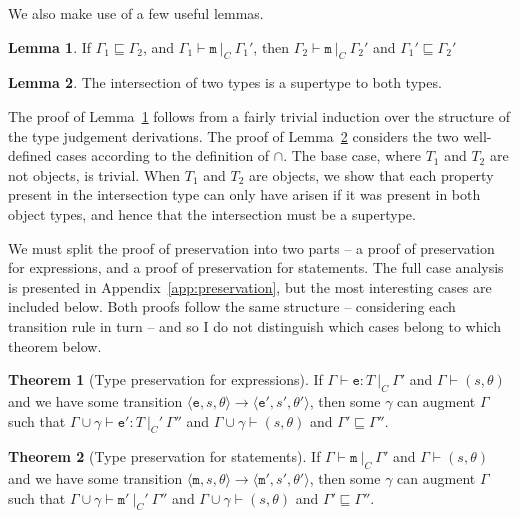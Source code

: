 \documentclass[12pt,a4paper,twoside,openright]{report}
\theoremstyle{definition}
\theoremstyle{dotless}
\newtheorem{lemma}{Lemma}[section]
\newtheorem{theorem}{Theorem}[section]
\newcommand{\transition}[6]{\langle{}\mathtt{#1},#2,#3\rangle{}\rightarrow{}\langle{}\mathtt{#4},#5,#6\rangle}
\begin{document}
We also make use of a few useful lemmas.
\begin{lemma}
  \label{lm:strChain}
  If $\Gamma_1 \sqsubseteq \Gamma_2$, and $\Gamma_1\vdash\mathtt{m}\ |_C\ \Gamma_1'$, 
  then $\Gamma_2\vdash\mathtt{m}\ |_C\ \Gamma_2'$ and
  $\Gamma_1'\sqsubseteq\Gamma_2'$ 
\end{lemma}
\begin{lemma}
  \label{lm:intersect}
	The intersection of two types is a supertype to both types. 
\end{lemma}

The proof of Lemma~\ref{lm:strChain} follows from a fairly trivial induction
over the structure of the type judgement derivations. The proof of
Lemma~\ref{lm:intersect} considers the two well-defined cases according to the
definition of $\cap$. The base case, where $T_1$ and $T_2$ are not objects, is
trivial. When $T_1$ and $T_2$ are objects, we show that each property present
in the intersection type can only have arisen if it was present in both object
types, and hence that the intersection must be a supertype.

We must split the proof of preservation into two parts -- a proof of
preservation for expressions, and a proof of preservation for statements. The
full case analysis is presented in Appendix~\ref{app:preservation}, but the
most interesting cases are included below. Both proofs follow the same
structure -- considering each transition rule in turn -- and so I do not
distinguish which cases belong to which theorem below.

\begin{theorem}[Type preservation for expressions]\label{expPreservation}
	If $\Gamma\vdash \mathtt{e}:T\ |_C\ \Gamma'$ and $\Gamma\vdash(s, \theta)$ and we have some
	transition $\transition{e}{s}{\theta}{e'}{s'}{\theta'}$, then some $\gamma$ can augment $\Gamma$ such that
	$\Gamma\!\cup\!\gamma\vdash\mathtt{e'}:T\ |_C'\ \Gamma''$ and $\Gamma\!\cup\!\gamma\vdash(s,\theta)$ and
	$\Gamma'\sqsubseteq\Gamma''$.
\end{theorem}
\begin{theorem}[Type preservation for statements]\label{mPreservation}
	If $\Gamma\vdash \mathtt{m}\ |_C\ \Gamma'$ and $\Gamma\vdash(s, \theta)$ and we have some
	transition $\transition{m}{s}{\theta}{m'}{s'}{\theta'}$, then some $\gamma$ can augment $\Gamma$ such that
	$\Gamma\!\cup\!\gamma\vdash\mathtt{m'}\ |_C'\ \Gamma''$ and $\Gamma\!\cup\!\gamma\vdash(s,\theta)$ and 
	$\Gamma'\sqsubseteq\Gamma''$.
\end{theorem}
\end{document}
